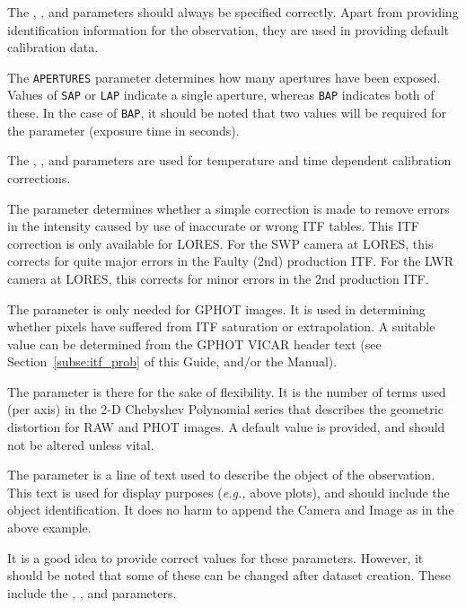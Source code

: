 The , ,
 and
 parameters should always be
specified correctly. Apart from providing identification information for
the observation, they are used in providing default calibration data.

The \verb+APERTURES+ parameter determines how many apertures have been exposed.
Values of \verb+SAP+ or \verb+LAP+ indicate a single aperture, whereas
\verb+BAP+ indicates both of these.  In the case of \verb+BAP+, it should be
noted that two values will be required for the
 parameter
(exposure time in seconds)\@.

The , ,
 and 
parameters are used for temperature and time dependent calibration
corrections.

The  parameter determines whether a
simple correction is made to
remove errors in the intensity caused by use of inaccurate or wrong ITF tables.
This ITF correction is only available for LORES\@.  For the SWP camera at
LORES, this corrects for quite major errors in the Faulty (2nd) production
ITF\@.  For the LWR camera at LORES, this corrects for minor errors in the 2nd
production ITF\@.

The  parameter is only needed for GPHOT
images.  It is used in
determining whether pixels have suffered from ITF saturation or
extrapolation.  A suitable value can be determined from the GPHOT VICAR
header text (see Section~\ref{subse:itf_prob} of this Guide, and/or the
Manual)\@.

The  parameter is there for the sake of
flexibility.  It is the
number of terms used (per axis) in the 2-D Chebyshev Polynomial series that
describes the geometric distortion for RAW and PHOT images.  A default value is
provided, and should not be altered unless vital.

The  parameter is a line of text used
to describe the object of
the observation.  This text is used for display purposes ({\it{e.g.,}} above
plots), and should include the object identification.
It does no harm to append the Camera and Image as in the above example.

It is a good idea to provide correct values for these
 parameters.
However, it should be noted that some of these can be changed after dataset
creation.  These include the ,
, 
and  parameters.



